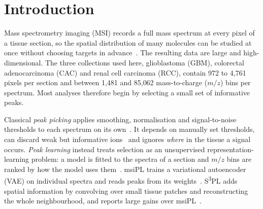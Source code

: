\section{Introduction}
\label{sec:introduction}

Mass spectrometry imaging (MSI) records a full mass spectrum at every pixel of
a tissue section, so the spatial distribution of many molecules can be studied
at once without choosing targets in
advance~\citep{caprioli1997maldi,schwamborn2010molecular,buchberger2018mass}.
The resulting data are large and high-dimensional. The three collections used
here, glioblastoma (GBM), colorectal adenocarcinoma (CAC) and renal cell
carcinoma (RCC), contain 972 to 4{,}761 pixels per section and between 1{,}481
and 85{,}062 mass-to-charge ($m/z$) bins per spectrum. Most
analyses therefore begin by selecting a small set of informative peaks.

Classical \emph{peak picking} applies smoothing, normalisation and
signal-to-noise thresholds to each spectrum on its
own~\citep{gibb2012maldiquant,deininger2011normalization}. It depends on
manually set thresholds, can discard weak but informative
ions~\citep{lieb2020sparse} and ignores \emph{where} in the tissue a signal
occurs. \emph{Peak learning} instead treats selection as an unsupervised
representation-learning problem: a model is fitted to the spectra of a section
and $m/z$ bins are ranked by how the model uses
them~\citep{li2022machinelearningpeakpicking,abdelmoula2021peak}. msiPL trains a
variational autoencoder (VAE) on individual spectra and reads peaks from its
weights~\citep{abdelmoula2021peak}. S\textsuperscript{3}PL adds spatial information by convolving
over small tissue patches and reconstructing the whole
neighbourhood, and reports large gains over msiPL~\citep{weigand2026spatial}.

